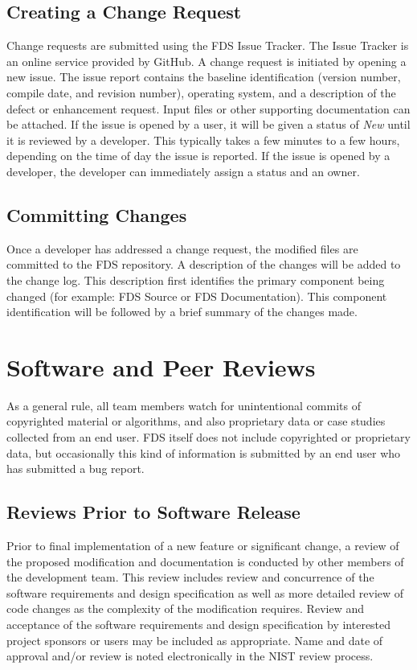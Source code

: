 \documentclass[11pt]{book}
\begin{document}
\subsection{Creating a Change Request}

Change requests are submitted using the FDS Issue Tracker.  The Issue Tracker is an online service provided by GitHub. A change request is initiated by opening a new issue.  The issue report contains the baseline identification (version number, compile date, and revision number), operating system, and a description of the defect or enhancement request.  Input files or other supporting documentation can be attached. If the issue is opened by a user, it will be given a status of {\em New} until it is reviewed by a developer. This typically takes a few minutes to a few hours, depending on the time of day the issue is reported. If the issue is opened by a developer, the developer can immediately assign a status and an owner.


\subsection{Committing Changes}

Once a developer has addressed a change request, the modified files are committed to the FDS repository.  A description of the changes will be added to the change log.  This description first identifies the primary component being changed (for example: FDS Source or FDS Documentation).  This component identification will be followed by a brief summary of the changes made.



\section{Software and Peer Reviews}


As a general rule, all team members watch for unintentional commits of copyrighted material or algorithms, and also proprietary data or case studies collected from an end user. FDS itself does not include copyrighted or proprietary data, but occasionally this kind of information is submitted by an end user who has submitted a bug report.

\subsection{Reviews Prior to Software Release}

Prior to final implementation of a new feature or significant change, a review of the proposed modification and documentation is conducted by other members of the development team.  This review includes review and concurrence of the software requirements and design specification as well as more detailed review of code changes as the complexity of the modification requires. Review and acceptance of the software requirements and design specification by interested project sponsors or users may be included as appropriate. Name and date of approval and/or review is noted electronically in the NIST review process.
\end{document}
